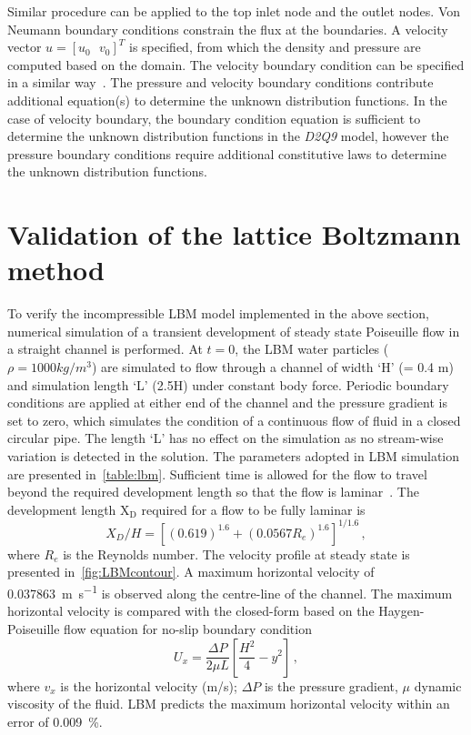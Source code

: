 Similar procedure can be applied to the top inlet node and the outlet 
nodes. Von Neumann boundary conditions constrain the flux at the boundaries. A 
velocity vector $u=\left[ u_0\mbox{ }v_0 \right]^T$ is specified, from which 
the density and pressure are computed based on the domain. The velocity 
boundary condition can be specified in a similar way~\citep{Zou1997}. The 
pressure and velocity boundary conditions contribute additional equation(s) 
to determine the unknown distribution functions. In the case of velocity 
boundary, the boundary condition equation is sufficient to determine the 
unknown distribution functions in the \textit{D2Q9} model, however the pressure 
boundary conditions 
require additional constitutive laws to determine the unknown distribution 
functions. 

\section{Validation of the lattice Boltzmann method}

To verify the incompressible LBM model implemented in the above section, 
numerical simulation of a transient development of steady state 
Poiseuille flow in a straight channel is performed. At $t=0$, the LBM water 
particles ($\rho=1000 kg/m^{3}$) are simulated to flow through a channel of 
width `H' (= 0.4 \si{\meter}) and simulation length `L' (2.5H) under constant 
body force. Periodic boundary conditions are applied at either end of the 
channel and the pressure gradient is set to zero, which simulates the condition 
of a continuous flow of fluid in a closed circular pipe. The length `L' has no 
effect on the simulation as no stream-wise variation is detected in the 
solution. The parameters adopted in LBM simulation are presented 
in~\cref{table:lbm}. Sufficient time is allowed for the flow to travel beyond 
the required development length so that the flow is laminar~\citep{Durst2005}. 
The development length  $\mathrm{X}_{\mathrm{D}}$ required for a flow to be 
fully laminar is
%
\begin{equation}
X_{D}/H=[(0.619)^{1.6}+(0.0567 R_{e})^{1.6}]^{1/1.6} \,,
\end{equation}
%
\noindent where $R_{e}$ is the Reynolds number. The velocity profile at steady 
state is presented in~\cref{fig:LBMcontour}. A maximum 
horizontal velocity of 0.037863~\si{\meter\per\second} is observed along the 
centre-line of the channel. The maximum horizontal velocity is compared with 
the closed-form based on the Haygen-Poiseuille flow equation for no-slip 
boundary condition~\citep{Willis2008}
%
\begin{equation}
	\mathit{U}_{\mathit{x}}=\frac{\Delta P}{2 \mu L} [\frac{H^{2}}{4}-y^{2}]\,,
\end{equation}
%
\noindent where $v_{x}$ is the horizontal velocity (m/s); $\Delta P$ is the 
pressure gradient, $\mu$ dynamic viscosity of the fluid. LBM predicts the 
maximum horizontal velocity within an error of 0.009~\%.

